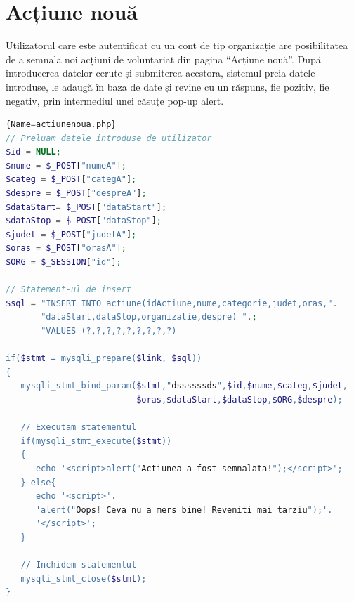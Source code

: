 \documentclass[12pt,a4paper]{report}
\begin{document}
\section{Acțiune nouă}
\par
Utilizatorul care este autentificat cu un cont de tip organizație are posibilitatea de a semnala noi acțiuni de voluntariat din pagina  “Acțiune nouă”. După introducerea datelor cerute și submiterea acestora, sistemul preia datele introduse, le adaugă în baza de date și revine cu un răspuns, fie pozitiv, fie negativ, prin intermediul unei căsuțe pop-up alert.
\\
\begin{lstlisting}[basicstyle=\small, language=PHP,caption=Secțiune de cod PHP responsabilă cu adăugarea unei acțiuni noi]{Name=actiunenoua.php}
// Preluam datele introduse de utilizator
$id = NULL;
$nume = $_POST["numeA"];
$categ = $_POST["categA"];
$despre = $_POST["despreA"];
$dataStart= $_POST["dataStart"];
$dataStop = $_POST["dataStop"];
$judet = $_POST["judetA"];
$oras = $_POST["orasA"];
$ORG = $_SESSION["id"];

// Statement-ul de insert
$sql = "INSERT INTO actiune(idActiune,nume,categorie,judet,oras,".
       "dataStart,dataStop,organizatie,despre) ".;
       "VALUES (?,?,?,?,?,?,?,?,?)

if($stmt = mysqli_prepare($link, $sql))
{
   mysqli_stmt_bind_param($stmt,"dssssssds",$id,$nume,$categ,$judet, 
                          $oras,$dataStart,$dataStop,$ORG,$despre);

   // Executam statementul
   if(mysqli_stmt_execute($stmt))
   {
      echo '<script>alert("Actiunea a fost semnalata!");</script>';
   } else{
      echo '<script>'.
      'alert("Oops! Ceva nu a mers bine! Reveniti mai tarziu");'.
      '</script>';
   }

   // Inchidem statementul
   mysqli_stmt_close($stmt);
}
\end{lstlisting}
\end{document}
